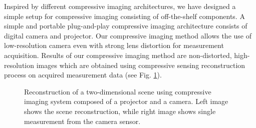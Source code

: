 \documentclass[journal]{IEEEtran}
\begin{document}
Inspired by different compressive imaging architectures, we have designed a simple setup for compressive imaging consisting of off-the-shelf components. A simple and portable plug-and-play compressive imaging architecture consists of digital camera and projector. Our compressive imaging method allows the use of low-resolution camera even with strong lens distortion for measurement acquisition. Results of our compressive imaging method are non-distorted, high-resolution images which are obtained using compressive sensing reconstruction process on acquired measurement data (see Fig. \ref{fig:our_results}).
%
\begin{figure}
	\centering
	
	\caption{Reconstruction of a two-dimensional scene using compressive imaging system composed of a projector and a camera. Left image shows the scene reconstruction, while right image shows single measurement from the camera sensor.}
		
	\label{fig:our_results}
\end{figure}

 



\end{document}
